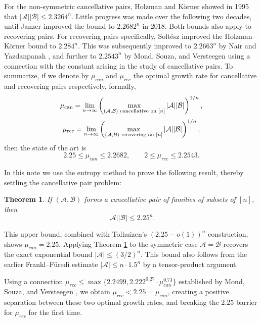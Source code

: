 \documentclass{article}
\newtheorem{theorem}{Theorem}[section]
\newtheorem{corollary}[theorem]{Corollary}
\begin{document}
For the non-symmetric cancellative pairs, Holzman and K\"orner \cite{HK95} showed in 1995 that $|\mathcal{A}||\mathcal{B}| \le 2.3264^n$. Little progress was made over the following two decades, until Janzer \cite{Janzer18} improved the bound to $2.2682^n$ in 2018. Both bounds also apply to recovering pairs. For recovering pairs specifically, Solt\'esz \cite{Soltesz18} improved the Holzman--K\"orner bound to $2.284^n$. This was subsequently improved to $2.2663^n$ by  Nair and Yazdanpanah \cite{NY20}, and further to $2.2543^n$ by Mond, Souza, and Versteegen \cite{MSV25} using a connection with the constant arising in the study of cancellative pairs. To summarize, if we denote by $\mu_{can}$ and $\mu_{rec}$ the optimal growth rate for cancellative and recovering pairs respectively, formally,
$$\mu_{\mathrm{can}}=\lim_{n \rightarrow \infty} \left(\max_{(\mathcal{A}, \mathcal{B}) \textup{~cancellative~on~} [n]} |\mathcal{A}||\mathcal{B}|\right)^{1/n},$$
$$\mu_{\mathrm{rec}}=\lim_{n \rightarrow \infty} \left(\max_{(\mathcal{A}, \mathcal{B}) \textup{~recovering~on~} [n]} |\mathcal{A}||\mathcal{B}|\right)^{1/n},$$
then the state of the art is 
$$2.25 \le \mu_{can} \le 2.2682, \qquad 2 \le \mu_{rec} \le 2.2543.$$

In this note we use the entropy method to prove the following result, thereby settling the cancellative pair problem:

\begin{theorem}\label{thm_main}
If $(\mathcal{A}, \mathcal{B})$ forms a cancellative pair of families of subsets of $[n]$, then 
$$|\mathcal{A}||\mathcal{B}| \le 2.25^n.$$
\end{theorem}
This upper bound, combined with Tolhuizen's $(2.25-o(1))^n$ construction, shows $\mu_{can}=2.25$. Applying Theorem \ref{thm_main} to the symmetric case \(\mathcal A=\mathcal B\) recovers the exact exponential bound \(|\mathcal A|\le(3/2)^n\). This bound also follows from the earlier Frankl--F\"uredi estimate  $|\mathcal{A}| \le n \cdot 1.5^n$ by a tensor-product argument.

Using a connection $\mu_{rec} \le \max\{2.2499, 2.222^{0.27} \cdot \mu_{can}^{0.73}\}$ established by Mond, Souza, and Versteegen \cite{MSV25}, we obtain $\mu_{rec} < 2.25=\mu_{can}$, creating a positive separation between these two optimal growth rates, and breaking the $2.25$ barrier for $\mu_{rec}$ for the first time.
\end{document}
